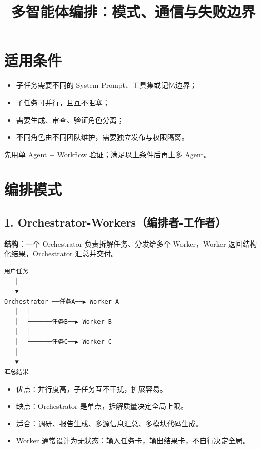 \documentclass[9pt,a4paper,twocolumn]{ctexart}
\begin{document}
\title{多智能体编排：模式、通信与失败边界}
\date{}
\maketitle
{}

\section*{适用条件}

\begin{itemize}[itemsep=1pt, topsep=2pt]
  \item 子任务需要不同的 System Prompt、工具集或记忆边界；
  \item 子任务可并行，且互不阻塞；
  \item 需要生成、审查、验证角色分离；
  \item 不同角色由不同团队维护，需要独立发布与权限隔离。
\end{itemize}


先用单 Agent + Workflow 验证；满足以上条件后再上多 Agent。



\section*{编排模式}


\subsection*{1. Orchestrator-Workers（编排者-工作者）}


\textbf{结构}：一个 Orchestrator 负责拆解任务、分发给多个 Worker，Worker 返回结构化结果，Orchestrator 汇总并交付。



\begin{lstlisting}
用户任务
   │
   ▼
Orchestrator ──任务A──▶ Worker A
   │  │
   │  └──────任务B──▶ Worker B
   │  │
   │  └──────任务C──▶ Worker C
   │
   ▼
汇总结果
\end{lstlisting}


\begin{itemize}[itemsep=1pt, topsep=2pt]
  \item 优点：并行度高，子任务互不干扰，扩展容易。
  \item 缺点：Orchestrator 是单点，拆解质量决定全局上限。
  \item 适合：调研、报告生成、多源信息汇总、多模块代码生成。
  \item Worker 通常设计为无状态：输入任务卡，输出结果卡，不自行决定全局。
\end{itemize}
\end{document}
